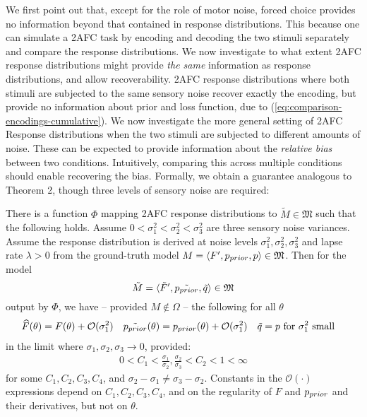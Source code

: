 \documentclass[si.tex]{subfiles}
\begin{document}
We first point out that, except for the role of motor noise, forced choice provides no information beyond that contained in response distributions. This because one can simulate a 2AFC task by encoding and decoding the two stimuli separately and compare the response distributions.
We now investigate to what extent 2AFC response distributions might provide \emph{the same} information as response distributions, and allow recoverability.
2AFC response distributions where both stimuli are subjected to the same sensory noise recover exactly the encoding, but provide no information about prior and loss function, due to (\ref{eq:comparison-encodings-cumulative}).
We now investigate the more general setting of 2AFC Response distributions when the two stimuli are subjected to different amounts of noise.
These can be expected to provide information about the \emph{relative bias} between two conditions.
Intuitively, comparing this across multiple conditions should enable recovering the bias.
Formally, we obtain a guarantee analogous to Theorem 2, though three levels of sensory noise are required:
%
%
%
%
\begin{thm}
%
There is a function $\Phi$ mapping 2AFC response distributions to $\tilde{M} \in \mathfrak{M}$ such that the following holds.
Assume $0 < \sigma_1^2 < \sigma_2^2 < \sigma_3^2$ are three sensory noise variances.
Assume the response distribution is derived at noise levels $\sigma_1^2, \sigma_2^2, \sigma_3^2$ and lapse rate $\lambda > 0$ from the ground-truth model $M = \langle F', p_{prior},p \rangle \in \mathfrak{M}$.
Then for the model
\begin{equation}
\tilde{M} = \langle \tilde{F}', \tilde{p_{prior}},\tilde{q}\rangle \in \mathfrak{M}
\end{equation}
output by $\Phi$, we have -- provided $M \not\in \Omega$ -- the following for all $\theta$
\begin{align*}
    \widehat{F}(\theta) &= F(\theta) + \mathcal{O}(\sigma_1^2) &
    \tilde{p_{prior}}(\theta) &= p_{prior}(\theta) + \mathcal{O}(\sigma_1^2) &
    \tilde{q} &= p  \text{ for $\sigma_1^2$ small}
\end{align*}
in the limit where $\sigma_1, \sigma_2, \sigma_3 \rightarrow 0$, provided: 
\begin{align*}
0 < C_1 < \frac{\sigma_1}{\sigma_2}, \frac{\sigma_2}{\sigma_3} < C_2 < 1 < \infty     
\end{align*}
for some $C_1, C_2, C_3, C_4$, and $\sigma_2-\sigma_1 \neq \sigma_3-\sigma_2$.
Constants in the $\mathcal{O}(\cdot)$ expressions depend on $C_1, C_2, C_3, C_4$, and on the regularity of $F$ and $p_{prior}$ and their derivatives, but not on $\theta$.

\end{thm}
\end{document}
